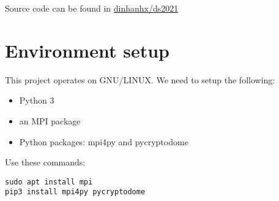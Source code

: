 Source code can be found in \href{https://github.com/dinhanhx/ds2021}{dinhanhx/ds2021}
\section{Environment setup}

This project operates on GNU/LINUX. We need to setup the following:


\begin{itemize}
    \item Python 3
    \item an MPI package
    \item Python packages: mpi4py and pycryptodome
    
\end{itemize}

Use these commands:
\begin{verbatim}
sudo apt install mpi
pip3 install mpi4py pycryptodome
\end{verbatim}